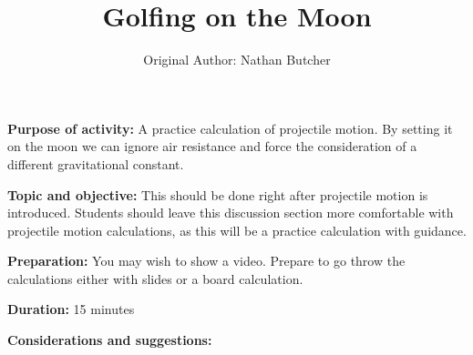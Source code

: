 \documentclass{article}
\title{Golfing on the Moon}
\author{Original Author: Nathan Butcher}
\date{}
\begin{document}
\maketitle
\thispagestyle{empty}

\textbf{Purpose of activity:} A practice calculation of projectile motion. By setting it on the moon we can ignore air resistance and force the consideration of a different gravitational constant.

\textbf{Topic and objective:} This should be done right after projectile motion is introduced. Students should leave this discussion section more comfortable with projectile motion calculations, as this will be a practice calculation with guidance. 

\textbf{Preparation:} You may wish to show a video. Prepare to go throw the calculations either with slides or a board calculation.

\textbf{Duration:} 15 minutes

\textbf{Considerations and suggestions:}

\hspace{14pt}
\end{document}
